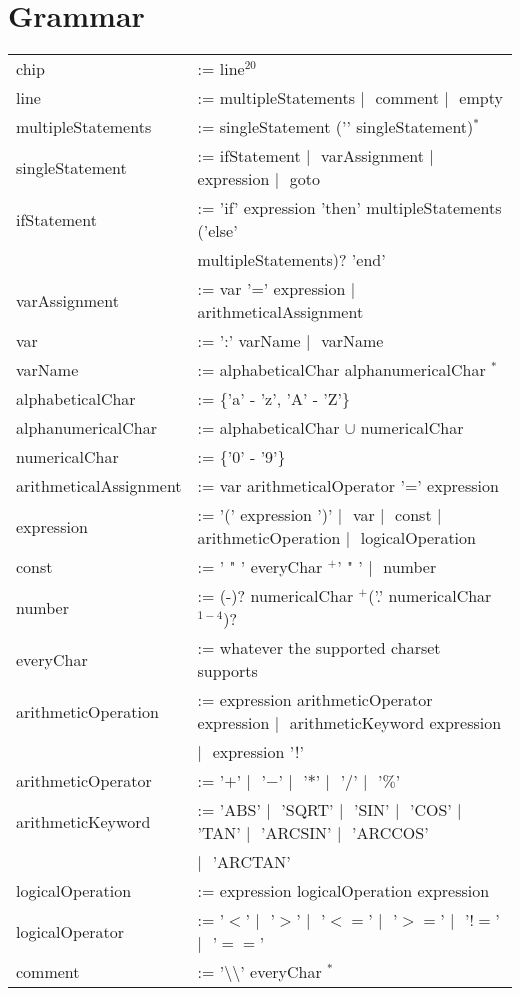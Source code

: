 \documentclass[]{scrartcl}
\newcommand{\pow}[1]{\ensuremath{^{#1}}}
\renewcommand{\star}{\ensuremath{^*}}
\newcommand{\plus}{\ensuremath{^+}}
\newcommand{\pipe}{\ensuremath{|\text{ }}}
\begin{document}
	\section*{Grammar}
	\begin{tabular}{ll}
		chip &:= line\pow{20} \\
		line &:= multipleStatements \pipe comment \pipe empty \\
		multipleStatements &:= singleStatement ('\textvisiblespace' singleStatement)\star \\
		singleStatement &:= ifStatement \pipe varAssignment \pipe expression \pipe goto \\
		ifStatement &:= 'if\textvisiblespace' expression '\textvisiblespace then\textvisiblespace' multipleStatements ('\textvisiblespace else\textvisiblespace' \\ & multipleStatements)? '\textvisiblespace end' \\
		varAssignment &:= var '=' expression \pipe arithmeticalAssignment \\
		var &:= ':' varName \pipe varName \\
		varName &:= alphabeticalChar alphanumericalChar \star \\
		alphabeticalChar &:= \{'a' - 'z', 'A' - 'Z'\} \\
		alphanumericalChar &:= alphabeticalChar $\cup$ numericalChar \\
		numericalChar &:= \{'0' - '9'\} \\
		arithmeticalAssignment & := var arithmeticalOperator '=' expression \\
		expression &:= '(' expression ')' \pipe var \pipe const \pipe arithmeticOperation \pipe logicalOperation \\
		const &:= ' " ' everyChar \plus ' " ' \pipe number \\
		number &:= (-)? numericalChar \plus ('.' numericalChar$^{1 - 4}$)? \\
		everyChar &:= whatever the supported charset supports \\
		arithmeticOperation &:= expression arithmeticOperator expression \pipe arithmeticKeyword expression \\ & \pipe expression '!' \\
		arithmeticOperator &:= '$+$' \pipe '$-$' \pipe '$*$' \pipe '$/$' \pipe '$\%$' \\
		arithmeticKeyword &:= 'ABS' \pipe 'SQRT' \pipe 'SIN' \pipe 'COS' \pipe 'TAN' \pipe 'ARCSIN' \pipe 'ARCCOS' \\ & \pipe 'ARCTAN' \\
		logicalOperation &:= expression logicalOperation expression \\
		logicalOperator &:= '$<$' \pipe '$>$' \pipe '$<=$' \pipe '$>=$' \pipe '$!=$' \pipe '$==$' \\
		comment & := '$\setminus \setminus$' everyChar \star \\
	\end{tabular}
\end{document}
